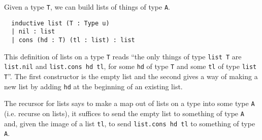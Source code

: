 \begin{dfn}[Lists]

  Given a type \texttt{T}, we can build lists of things of type \texttt{A}.

  \begin{lstlisting}
  inductive list (T : Type u)
  | nil : list
  | cons (hd : T) (tl : list) : list \end{lstlisting}

  This definition of lists on a type \texttt{T} reads
  ``the only things of type \texttt{list T} are
  \texttt{list.nil} and \texttt{list.cons hd tl},
  for some \texttt{hd} of type \texttt{T}
  and some \texttt{tl} of type \texttt{list T}''.
  The first constructor is the empty list and the
  second gives a way of making a new list by adding \texttt{hd}
  at the beginning of an existing list.
\end{dfn}

The recursor for lists says to make a map out of lists on a type
into some type \texttt{A} (i.e. recurse on lists),
it suffices to send the empty list to something of type \texttt{A}
and, given the image of a list \texttt{tl},
to send \texttt{list.cons hd tl} to something of type \texttt{A}.
